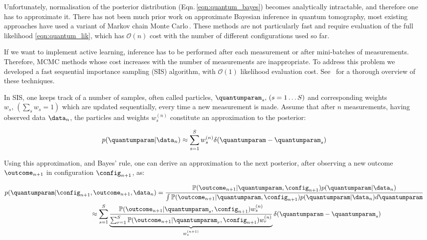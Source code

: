Unfortunately, normalisation of the posterior distribution (Eqn.\,\eqref{eqn:quantum_bayes}) becomes analytically intractable, and therefore one has to approximate it. There has not been much prior work on approximate Bayesian inference in quantum tomography, most existing approaches have used a variant of Markov chain Monte Carlo\,\cite[MCMC,][and refs.\ therein]{BayesianTomography}. These methods are not particularly fast and require evaluation of the full likelihood \eqref{eqn:quantum_lik}, which has $\mathcal{O}(n)$ cost with the number of different configurations used so far.

If we want to implement active learning, inference has to be performed after each measurement or after mini-batches of measurements. Therefore, MCMC methods whose cost increases with the number of measurements are inappropriate. To address this problem we developed a fast sequential importance sampling (SIS) algorithm, with $\mathcal{O}(1)$ likelihood evaluation cost. See \,\citep{SMCBook} for a thorough overview of these techniques.

In SIS, one keeps track of a number of samples, often called particles, $\quantumparam_s,\, (s=1\ldots S)$ and corresponding weights $w_s, \, \left( \sum_s w_s = 1 \right)$  which are updated sequentially, every time a new measurement is made. Assume that after $n$ measurements, having observed data $\data_n$, the particles and weights  $w^{(n)}_s$ constitute an approximation to the posterior:	

\begin{equation}
	p(\quantumparam\vert\data_n)\approx \sum_{s=1}^{S}w^{(n)}_s\delta(\quantumparam-\quantumparam_s)\label{eqn:quantum_SISapprox}
\end{equation}

Using this approximation, and Bayes' rule, one can derive an approximation to the next posterior, after observing a new outcome $\outcome_{n+1}$ in configuration $\config_{n+1}$, as:

\begin{align}
	p(\quantumparam\vert\config_{n+1}&,\outcome_{n+1},\data_n) = \frac{\mathbb{P}(\outcome_{n+1}\vert\quantumparam,\config_{n+1})p(\quantumparam\vert\data_n)}{\int \mathbb{P}(\outcome_{n+1}\vert\quantumparam,\config_{n+1})p(\quantumparam\vert\data_n) d\quantumparam}\label{eqn:quantum_SISupdate}\\
	&\approx \sum_{s=1}^{S}\underbrace{\frac{\mathbb{P}(\outcome_{n+1}\vert\quantumparam_s,\config_{n+1})w^{(n)}_s}{\sum_{r=1}^{S}\mathbb{P}(\outcome_{n+1}\vert\quantumparam_r,\config_{n+1})w^{(n)}_r}}_{w^{(n+1)}_s}\delta(\quantumparam-\quantumparam_s)\notag
\end{align}

